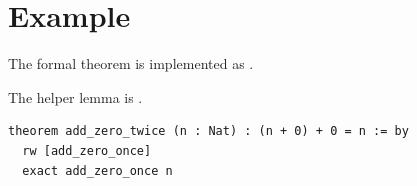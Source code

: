 \section{Example}

The formal theorem is implemented as .

The helper lemma is .

\begin{lstlisting}[language=Lean]
theorem add_zero_twice (n : Nat) : (n + 0) + 0 = n := by
  rw [add_zero_once]
  exact add_zero_once n
\end{lstlisting}


